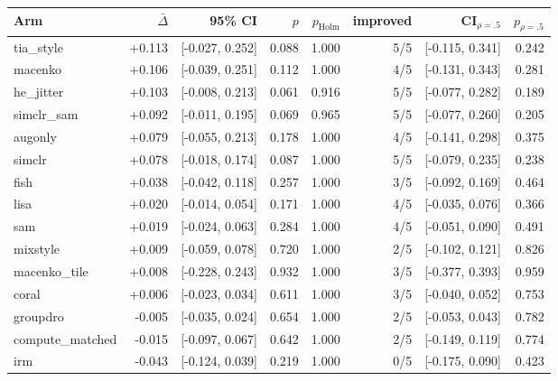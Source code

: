 \begin{tabular}{lrrrrrrr}
\toprule
Arm & $\bar\Delta$ & 95\% CI & $p$ & $p_\text{Holm}$ & improved & CI$_{\rho=.5}$ & $p_{\rho=.5}$ \\
\midrule
tia\_style & +0.113 & [-0.027, 0.252] & 0.088 & 1.000 & 5/5 & [-0.115, 0.341] & 0.242 \\
macenko & +0.106 & [-0.039, 0.251] & 0.112 & 1.000 & 4/5 & [-0.131, 0.343] & 0.281 \\
he\_jitter & +0.103 & [-0.008, 0.213] & 0.061 & 0.916 & 5/5 & [-0.077, 0.282] & 0.189 \\
simclr\_sam & +0.092 & [-0.011, 0.195] & 0.069 & 0.965 & 5/5 & [-0.077, 0.260] & 0.205 \\
augonly & +0.079 & [-0.055, 0.213] & 0.178 & 1.000 & 4/5 & [-0.141, 0.298] & 0.375 \\
simclr & +0.078 & [-0.018, 0.174] & 0.087 & 1.000 & 5/5 & [-0.079, 0.235] & 0.238 \\
fish & +0.038 & [-0.042, 0.118] & 0.257 & 1.000 & 3/5 & [-0.092, 0.169] & 0.464 \\
lisa & +0.020 & [-0.014, 0.054] & 0.171 & 1.000 & 4/5 & [-0.035, 0.076] & 0.366 \\
sam & +0.019 & [-0.024, 0.063] & 0.284 & 1.000 & 4/5 & [-0.051, 0.090] & 0.491 \\
mixstyle & +0.009 & [-0.059, 0.078] & 0.720 & 1.000 & 2/5 & [-0.102, 0.121] & 0.826 \\
macenko\_tile & +0.008 & [-0.228, 0.243] & 0.932 & 1.000 & 3/5 & [-0.377, 0.393] & 0.959 \\
coral & +0.006 & [-0.023, 0.034] & 0.611 & 1.000 & 3/5 & [-0.040, 0.052] & 0.753 \\
groupdro & -0.005 & [-0.035, 0.024] & 0.654 & 1.000 & 2/5 & [-0.053, 0.043] & 0.782 \\
compute\_matched & -0.015 & [-0.097, 0.067] & 0.642 & 1.000 & 2/5 & [-0.149, 0.119] & 0.774 \\
irm & -0.043 & [-0.124, 0.039] & 0.219 & 1.000 & 0/5 & [-0.175, 0.090] & 0.423 \\
\bottomrule
\end{tabular}
